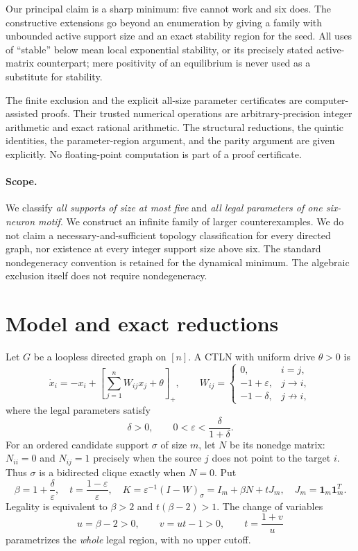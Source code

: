 \documentclass[11pt,a4paper]{article}
\theoremstyle{definition}\newtheorem{definition}[theorem]{Definition}
\theoremstyle{remark}\newtheorem{remark}[theorem]{Remark}
\newcommand{\ones}{\mathbf{1}}
\newcommand{\eps}{\varepsilon}
\begin{document}
Our principal claim is a sharp minimum: five cannot work and six does. The constructive extensions go beyond an enumeration by giving a family with unbounded active support size and an exact stability region for the seed. All uses of ``stable'' below mean local exponential stability, or its precisely stated active-matrix counterpart; mere positivity of an equilibrium is never used as a substitute for stability.

The finite exclusion and the explicit all-size parameter certificates are computer-assisted proofs. Their trusted numerical operations are arbitrary-precision integer arithmetic and exact rational arithmetic. The structural reductions, the quintic identities, the parameter-region argument, and the parity argument are given explicitly. No floating-point computation is part of a proof certificate.

\paragraph{Scope.}
We classify \emph{all supports of size at most five} and \emph{all legal parameters of one six-neuron motif}. We construct an infinite family of larger counterexamples. We do not claim a necessary-and-sufficient topology classification for every directed graph, nor existence at every integer support size above six. The standard nondegeneracy convention is retained for the dynamical minimum. The algebraic exclusion itself does not require nondegeneracy.

\section{Model and exact reductions}\label{sec:model}
Let $G$ be a loopless directed graph on $[n]$. A CTLN with uniform drive $\theta>0$ is
\begin{equation}\label{eq:ode}
 \dot x_i=-x_i+\left[\sum_{j=1}^nW_{ij}x_j+\theta\right]_+,
 \qquad
 W_{ij}=\begin{cases}
 0,&i=j,\\-1+\eps,&j\to i,\\-1-\delta,&j\not\to i,
 \end{cases}
\end{equation}
where the legal parameters satisfy
\begin{equation}\label{eq:legal}
 \delta>0,\qquad 0<\eps<\frac{\delta}{1+\delta}.
\end{equation}
For an ordered candidate support $\sigma$ of size $m$, let $N$ be its nonedge matrix:
$N_{ii}=0$ and $N_{ij}=1$ precisely when the source $j$ does not point to the target $i$.
Thus $\sigma$ is a bidirected clique exactly when $N=0$.
Put
\begin{equation}\label{eq:K}
 \beta=1+\frac{\delta}{\eps},\quad
 t=\frac{1-\eps}{\eps},\quad
 K=\eps^{-1}(I-W)_\sigma=I_m+\beta N+tJ_m,
 \quad J_m=\ones_m\ones_m^T.
\end{equation}
Legality is equivalent to $\beta>2$ and $t(\beta-2)>1$. The change of variables
\begin{equation}\label{eq:uv}
 u=\beta-2>0,\qquad v=ut-1>0,\qquad t=\frac{1+v}{u}
\end{equation}
parametrizes the \emph{whole} legal region, with no upper cutoff.
\end{document}
